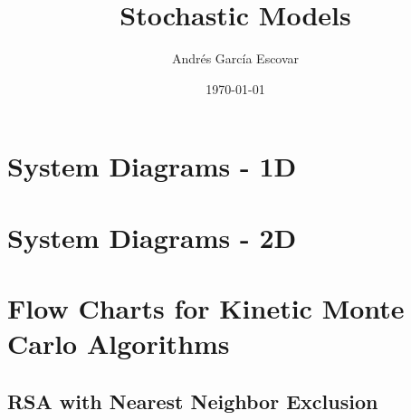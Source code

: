 \documentclass[letterpaper]{article}
\title{Stochastic Models}
\author{Andr\'es Garc\'ia Escovar}
\date{\today}
\begin{document}
    \maketitle
    \tableofcontents
    \newpage
    \section{System Diagrams - 1D}

       
    \newpage
    \section{System Diagrams - 2D}


    \newpage
    \section{Flow Charts for Kinetic Monte Carlo Algorithms}


    \subsection{RSA with Nearest Neighbor Exclusion}
\end{document}
